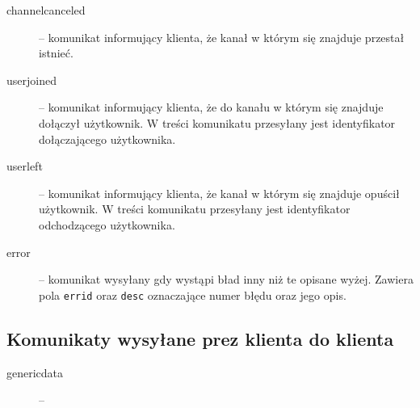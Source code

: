 \documentclass[a4paper, 10pt]{article}
\begin{document}
\begin{description}
 \item[channelcanceled] -- komunikat informujący klienta, że kanał w którym się znajduje przestał istnieć.
  \item[userjoined] -- komunikat informujący klienta, że do kanału w którym się znajduje dołączył użytkownik. W treści komunikatu przesyłany jest identyfikator dołączającego użytkownika.
 \item[userleft] -- komunikat informujący klienta, że kanał w którym się znajduje opuścił użytkownik. W treści komunikatu przesyłany jest identyfikator odchodzącego użytkownika.
 \item[error] -- komunikat wysyłany gdy wystąpi bład inny niż te opisane wyżej. Zawiera pola \texttt{errid} oraz \texttt{desc} oznaczające numer błędu oraz jego opis.
\end{description}

\subsection{Komunikaty wysyłane prez klienta do klienta}
\begin{description}
\item[genericdata]  -- 
\end{description}
\end{document}
